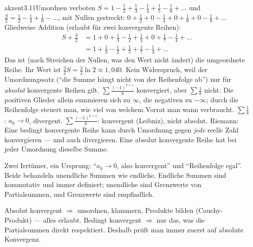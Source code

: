 \begin{loesungkarte}{akzent}{3.11}{Umordnen verboten}
$S = 1 - \frac12 + \frac13 - \frac14 + \frac15 - \frac16 + \dots$ und $\frac S2 = \frac12 - \frac14 + \frac16 - \dots$, mit Nullen gestreckt: $0 + \frac12 + 0 - \frac14 + 0 + \frac16 + 0 - \frac18 + \dots$ Gliedweise Addition (erlaubt für zwei konvergente Reihen):
\begin{align*} S + \tfrac S2 &= 1 + 0 + \tfrac13 - \tfrac12 + \tfrac15 + 0 + \tfrac17 - \tfrac14 + \dots\\ &= 1 + \tfrac13 - \tfrac12 + \tfrac15 + \tfrac17 - \tfrac14 + \dots \end{align*}
Das ist (nach Streichen der Nullen, was den Wert nicht ändert) die umgeordnete Reihe. Ihr Wert ist $\frac32S = \frac32\ln2\approx1{,}040$.
Kein Widerspruch, weil der Umordnungssatz (\enquote{die Summe hängt nicht von der Reihenfolge ab}) nur für \emph{absolut} konvergente Reihen gilt. $\sum\frac{(-1)^{k+1}}k$ konvergiert, aber $\sum\frac1k$ nicht. Die positiven Glieder allein summieren sich zu $\infty$, die negativen zu $-\infty$; durch die Reihenfolge steuert man, wie viel von welchem Vorrat man wann verbraucht.
$\sum\frac1k$: $a_k\to0$, divergent. $\sum\frac{(-1)^{k+1}}k$: konvergent (Leibniz), nicht absolut.
Riemann: Eine bedingt konvergente Reihe kann durch Umordnung gegen \emph{jede} reelle Zahl konvergieren --- und auch divergieren. Eine absolut konvergente Reihe hat bei jeder Umordnung dieselbe Summe.
\begin{fehler}\kastentext
Zwei Irrtümer, ein Ursprung: \enquote{$a_k\to0$, also konvergent} und \enquote{Reihenfolge egal}. Beide behandeln unendliche Summen wie endliche. Endliche Summen sind kommutativ und immer definiert; unendliche sind Grenzwerte von Partialsummen, und Grenzwerte sind empfindlich.
\end{fehler}
\begin{mitnehmen}\kastentext
Absolut konvergent $\Rightarrow$ umordnen, klammern, Produkte bilden (Cauchy-Produkt) --- alles erlaubt. Bedingt konvergent $\Rightarrow$ nur das, was die Partialsummen direkt respektiert. Deshalb prüft man immer zuerst auf absolute Konvergenz.
\end{mitnehmen}
\end{loesungkarte}

